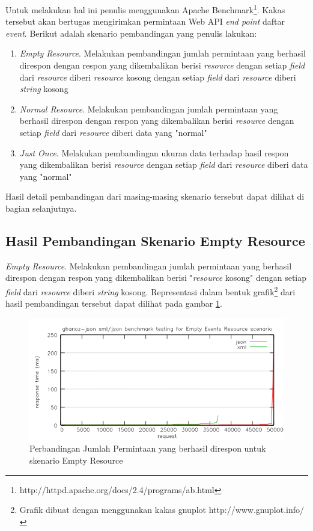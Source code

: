 \documentclass[a4paper, 12pt, oneside]{report}
\begin{document}
Untuk melakukan hal ini penulis menggunakan Apache Benchmark\footnote{http://httpd.apache.org/docs/2.4/programs/ab.html}. Kakas tersebut akan bertugas mengirimkan permintaan Web API \textit{end point} daftar \textit{event}. Berikut adalah skenario pembandingan yang penulis lakukan:

\begin{enumerate}
  \item \textit{Empty Resource}. Melakukan pembandingan jumlah permintaan yang berhasil direspon dengan respon yang dikembalikan berisi \textit{resource} dengan setiap \textit{field} dari \textit{resource} diberi \textit{resource} kosong dengan setiap \textit{field} dari \textit{resource} diberi \textit{string} kosong
  \item \textit{Normal Resource}. Melakukan pembandingan jumlah permintaan yang berhasil direspon dengan respon yang dikembalikan berisi \textit{resource} dengan setiap \textit{field} dari \textit{resource} diberi data yang "normal"
  \item \textit{Just Once}. Melakukan pembandingan ukuran data terhadap hasil respon yang dikembalikan berisi \textit{resource} dengan setiap \textit{field} dari \textit{resource} diberi data yang "normal"
\end{enumerate}

Hasil detail pembandingan dari masing-masing skenario tersebut dapat dilihat di bagian selanjutnya.

\subsection{Hasil Pembandingan Skenario Empty Resource}

\onehalfspacing \textit{Empty Resource}. Melakukan pembandingan jumlah permintaan yang berhasil direspon dengan respon yang dikembalikan berisi "\textit{resource} kosong" dengan setiap \textit{field} dari \textit{resource} diberi \textit{string} kosong. Representasi dalam bentuk grafik\footnote{Grafik dibuat dengan menggunakan kakas gnuplot http://www.gnuplot.info/} dari hasil pembandingan tersebut dapat dilihat pada gambar \ref{benchmark-empty-resource}.

\begin{figure}[htp]
\centering
\includegraphics[scale=0.65]{images/benchmark-empty-resource.png}
\caption{Perbandingan Jumlah Permintaan yang berhasil direspon untuk skenario Empty Resource}
\label{benchmark-empty-resource}
\end{figure}
\end{document}
